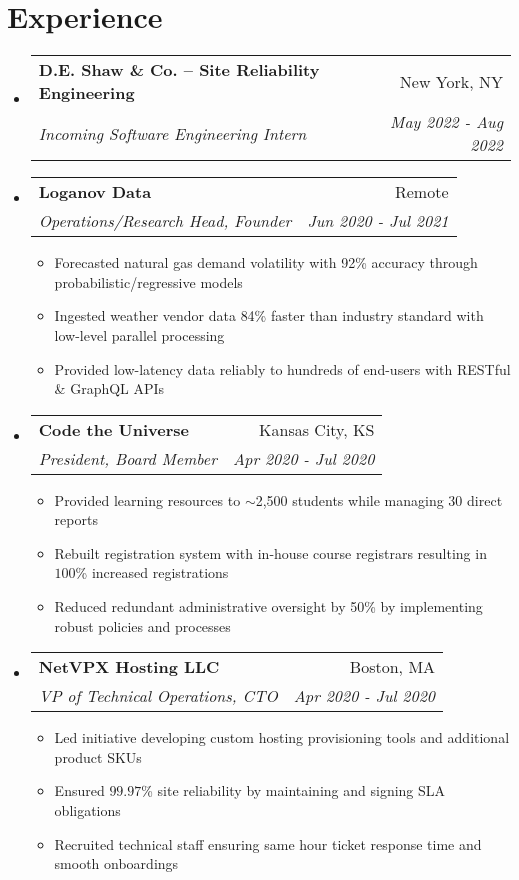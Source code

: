 \documentclass[a4paper,12pt]{extarticle}
\makeatletter
\newcommand{\resumeItem}[1]{
	\item\small{
		#1 \vspace{-2pt}
	}
}
\newcommand{\resumeSubheading}[4]{
	\vspace{-1pt}\item
		\begin{tabular*}{0.97\textwidth}{l@{\extracolsep{\fill}}r}
			\textbf{#1} & #2 \\
			\textit{#3} & \textit{#4} \\
		\end{tabular*}\vspace{-5pt}
}
\newcommand{\resumeSubHeadingListStart}{\begin{itemize}[leftmargin=0.15in,label={}]}
\newcommand{\resumeSubHeadingListEnd}{\end{itemize}}
\newcommand{\resumeItemListStart}{\begin{itemize}\vspace{-3pt}}
\newcommand{\resumeItemListEnd}{\end{itemize}\vspace{-5pt}}
\makeatother
\begin{document}
\section{Experience}
	\resumeSubHeadingListStart
	\resumeSubheading{D.E. Shaw \& Co. -- Site Reliability Engineering}
		{New York, NY}
		{Incoming Software Engineering Intern}{May 2022 - Aug 2022}
		\resumeSubheading{Loganov Data}{Remote}
		{Operations/Research Head, Founder}{Jun 2020 - Jul 2021}
		\resumeItemListStart
			\resumeItem{Forecasted natural gas demand volatility with 92\%
				accuracy through probabilistic/regressive models}
			\resumeItem{Ingested weather vendor data 84\% faster than industry
				standard with low-level parallel processing}
			\resumeItem{Provided low-latency data reliably to hundreds of
				end-users with RESTful \& GraphQL APIs}
		\resumeItemListEnd
		\resumeSubheading{Code the Universe}{Kansas City, KS}
		{President, Board Member}{Apr 2020 - Jul 2020}
		\resumeItemListStart
			\resumeItem{Provided learning resources to $\sim$2,500
				students while managing 30 direct reports}
			\resumeItem{Rebuilt registration system with in-house course
				registrars resulting in $100$\% increased registrations}
			\resumeItem{Reduced redundant administrative oversight by 50\% by 
				implementing robust policies and processes}
		\resumeItemListEnd
		\resumeSubheading{NetVPX Hosting LLC}{Boston, MA}
		{VP of Technical Operations, CTO}{Apr 2020 - Jul 2020}
		\resumeItemListStart
			\resumeItem{Led initiative developing custom hosting provisioning
				tools and additional product SKUs}
			\resumeItem{Ensured $99.97$\% site reliability by maintaining
				and signing SLA obligations}
			\resumeItem{Recruited technical staff ensuring same hour ticket
				response time and smooth onboardings}
		\resumeItemListEnd
	\resumeSubHeadingListEnd
\vspace{-5mm}
\end{document}
